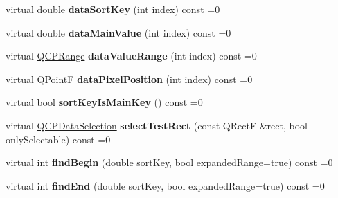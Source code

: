\begin{DoxyCompactItemize}
\item 
virtual double {\bfseries data\+Sort\+Key} (int index) const =0\hypertarget{class_q_c_p_plottable_interface1_d_aa21351ab3d6edbcf8d95f9c377e5003b}{}\label{class_q_c_p_plottable_interface1_d_aa21351ab3d6edbcf8d95f9c377e5003b}

\item 
virtual double {\bfseries data\+Main\+Value} (int index) const =0\hypertarget{class_q_c_p_plottable_interface1_d_a17f6fbd78e004b6f3c8257fea50f9808}{}\label{class_q_c_p_plottable_interface1_d_a17f6fbd78e004b6f3c8257fea50f9808}

\item 
virtual \hyperlink{class_q_c_p_range}{Q\+C\+P\+Range} {\bfseries data\+Value\+Range} (int index) const =0\hypertarget{class_q_c_p_plottable_interface1_d_af9a720ace6499337406a5e65d4823f57}{}\label{class_q_c_p_plottable_interface1_d_af9a720ace6499337406a5e65d4823f57}

\item 
virtual Q\+PointF {\bfseries data\+Pixel\+Position} (int index) const =0\hypertarget{class_q_c_p_plottable_interface1_d_a35fd032c6e5226ff7b50e0f37c57922b}{}\label{class_q_c_p_plottable_interface1_d_a35fd032c6e5226ff7b50e0f37c57922b}

\item 
virtual bool {\bfseries sort\+Key\+Is\+Main\+Key} () const =0\hypertarget{class_q_c_p_plottable_interface1_d_acec8492c49e051aaec5ca5267900a98e}{}\label{class_q_c_p_plottable_interface1_d_acec8492c49e051aaec5ca5267900a98e}

\item 
virtual \hyperlink{class_q_c_p_data_selection}{Q\+C\+P\+Data\+Selection} {\bfseries select\+Test\+Rect} (const Q\+RectF \&rect, bool only\+Selectable) const =0\hypertarget{class_q_c_p_plottable_interface1_d_a05874ade11a735bb290bb96ccf7fdac1}{}\label{class_q_c_p_plottable_interface1_d_a05874ade11a735bb290bb96ccf7fdac1}

\item 
virtual int {\bfseries find\+Begin} (double sort\+Key, bool expanded\+Range=true) const =0\hypertarget{class_q_c_p_plottable_interface1_d_ac8f224af7f2afeed46d82368344d8d9e}{}\label{class_q_c_p_plottable_interface1_d_ac8f224af7f2afeed46d82368344d8d9e}

\item 
virtual int {\bfseries find\+End} (double sort\+Key, bool expanded\+Range=true) const =0\hypertarget{class_q_c_p_plottable_interface1_d_a2a6f8cad846ea18d3ab46a95047de681}{}\label{class_q_c_p_plottable_interface1_d_a2a6f8cad846ea18d3ab46a95047de681}

\end{DoxyCompactItemize}


